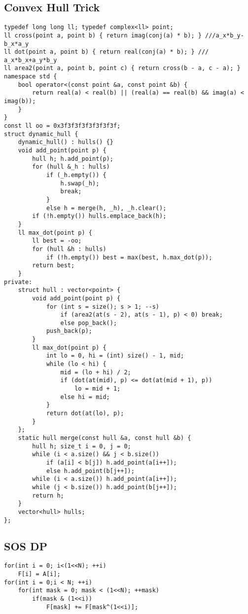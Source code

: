 \documentclass[landscape, 8pt, a4paper, oneside]{extarticle}
\begin{document}
\begin{multicols}{3}
\subsection{Convex Hull Trick}
\begin{verbatim}
typedef long long ll; typedef complex<ll> point;
ll cross(point a, point b) { return imag(conj(a) * b); } ///a_x*b_y-b_x*a_y
ll dot(point a, point b) { return real(conj(a) * b); } /// a_x*b_x+a_y*b_y
ll area2(point a, point b, point c) { return cross(b - a, c - a); }
namespace std {
    bool operator<(const point &a, const point &b) {
        return real(a) < real(b) || (real(a) == real(b) && imag(a) < imag(b));
    }
}
const ll oo = 0x3f3f3f3f3f3f3f3f;
struct dynamic_hull {
    dynamic_hull() : hulls() {}
    void add_point(point p) {
        hull h; h.add_point(p);
        for (hull &_h : hulls)
            if (_h.empty()) {
                h.swap(_h);
                break;
            }
            else h = merge(h, _h), _h.clear();
        if (!h.empty()) hulls.emplace_back(h);
    }
    ll max_dot(point p) {
        ll best = -oo;
        for (hull &h : hulls)
            if (!h.empty()) best = max(best, h.max_dot(p));
        return best;
    }
private:
    struct hull : vector<point> {
        void add_point(point p) {
            for (int s = size(); s > 1; --s)
                if (area2(at(s - 2), at(s - 1), p) < 0) break;
                else pop_back();
            push_back(p);
        }
        ll max_dot(point p) {
            int lo = 0, hi = (int) size() - 1, mid;
            while (lo < hi) {
                mid = (lo + hi) / 2;
                if (dot(at(mid), p) <= dot(at(mid + 1), p))
                    lo = mid + 1;
                else hi = mid;
            }
            return dot(at(lo), p);
        }
    };
    static hull merge(const hull &a, const hull &b) {
        hull h; size_t i = 0, j = 0;
        while (i < a.size() && j < b.size())
            if (a[i] < b[j]) h.add_point(a[i++]);
            else h.add_point(b[j++]);
        while (i < a.size()) h.add_point(a[i++]);
        while (j < b.size()) h.add_point(b[j++]);
        return h;
    }
    vector<hull> hulls;
};  
\end{verbatim}
\subsection{SOS DP}
\begin{verbatim}
for(int i = 0; i<(1<<N); ++i)
    F[i] = A[i];
for(int i = 0;i < N; ++i)
    for(int mask = 0; mask < (1<<N); ++mask)
        if(mask & (1<<i))
            F[mask] += F[mask^(1<<i)];
\end{verbatim}

\end{multicols}
\end{document}
